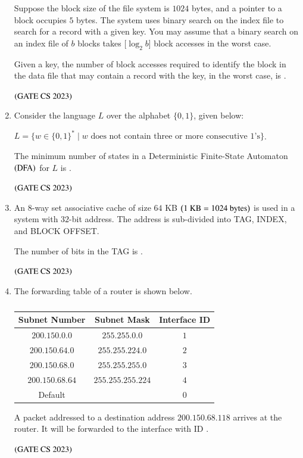 \documentclass[journal,12pt,onecolumn]{IEEEtran}
\theoremstyle{remark}
\begin{document}
\begin{enumerate}
			
			Suppose the block size of the file system is $1024$ bytes, and a pointer to a block occupies $5$ bytes. The system uses binary search on the index file to search for a record with a given key. You may assume that a binary search on an index file of $b$ blocks takes [$\log_2 b$] block accesses in the worst case.
			
			Given a key, the number of block accesses required to identify the block in the data file that may contain a record with the key, in the worst case, is \underline{\hspace{2cm}}.
			
			\hfill $\left(\text{GATE CS 2023}\right)$
			
			\item Consider the language $L$ over the alphabet $\{0, 1\}$, given below:
			
			$L = \{w \in \{0, 1\}^* \mid w \text{ does not contain three or more consecutive } 1\text{'s}\}$.
			
			The minimum number of states in a Deterministic Finite-State Automaton $\left(\text{DFA}\right)$ for $L$ is \underline{\hspace{2cm}}.
			
			\hfill $\left(\text{GATE CS 2023}\right)$
			
			\item An $8$-way set associative cache of size $64$ KB $\left(1 \text{ KB} = 1024 \text{ bytes}\right)$ is used in a system with $32$-bit address. The address is sub-divided into TAG, INDEX, and BLOCK OFFSET.
			
			The number of bits in the TAG is \underline{\hspace{2cm}}.
			
			\hfill $\left(\text{GATE CS 2023}\right)$
			
			\item The forwarding table of a router is shown below.
			
			\begin{table}[h]
				\centering
				\caption*{}
				\label{tab:forwarding}
				\begin{tabular}{|c|c|c|}
					\hline
					Subnet Number & Subnet Mask & Interface ID \\
					\hline
					$200.150.0.0$ & $255.255.0.0$ & $1$ \\
					\hline
					$200.150.64.0$ & $255.255.224.0$ & $2$ \\
					\hline
					$200.150.68.0$ & $255.255.255.0$ & $3$ \\
					\hline
					$200.150.68.64$ & $255.255.255.224$ & $4$ \\
					\hline
					Default & & $0$ \\
					\hline
				\end{tabular}
			\end{table}
			
			A packet addressed to a destination address $200.150.68.118$ arrives at the router. It will be forwarded to the interface with ID \underline{\hspace{2cm}}.
			
			\hfill $\left(\text{GATE CS 2023}\right)$

		
	\end{enumerate}
\end{document}
